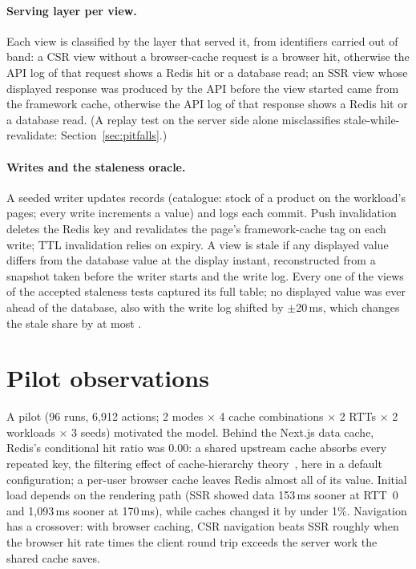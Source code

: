 \documentclass[acmsmall,review,nonacm]{acmart}
\begin{document}
\paragraph{Serving layer per view.}
Each view is classified by the layer that served it, from identifiers carried out of band: a CSR view without a browser-cache request is a browser hit, otherwise the API log of that request shows a Redis hit or a database read; an SSR view whose displayed response was produced by the API before the view started came from the framework cache, otherwise the API log of that response shows a Redis hit or a database read. (A replay test on the server side alone misclassifies stale-while-revalidate: Section~\ref{sec:pitfalls}.)

\paragraph{Writes and the staleness oracle.}
A seeded writer updates records (catalogue: stock of a product on the workload's pages; every write increments a value) and logs each commit. Push invalidation deletes the Redis key and revalidates the page's framework-cache tag on each write; TTL invalidation relies on expiry. A view is stale if any displayed value differs from the database value at the display instant, reconstructed from a snapshot taken before the writer starts and the write log. Every one of the \AfiveViews{} views of the accepted staleness tests captured its full table; no displayed value was ever ahead of the database, also with the write log shifted by $\pm$20\,ms, which changes the stale share by at most \AfiveShiftMax{}.

\section{Pilot observations}
\label{sec:pilot}

A pilot (96 runs, 6{,}912 actions; 2 modes $\times$ 4 cache combinations $\times$ 2 RTTs $\times$ 2 workloads $\times$ 3 seeds) motivated the model.
Behind the Next.js data cache, Redis's conditional hit ratio was 0.00: a shared upstream cache absorbs every repeated key, the filtering effect of cache-hierarchy theory~\cite{che2002hierarchical,fofack2014ttl}, here in a default configuration; a per-user browser cache leaves Redis almost all of its value.
Initial load depends on the rendering path (SSR showed data 153\,ms sooner at RTT~0 and 1{,}093\,ms sooner at 170\,ms), while caches changed it by under 1\%.
Navigation has a crossover: with browser caching, CSR navigation beats SSR roughly when the browser hit rate times the client round trip exceeds the server work the shared cache saves.
\end{document}
